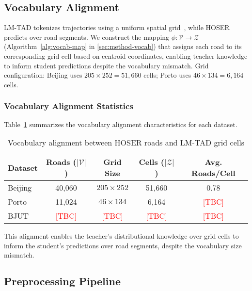 \subsection{Vocabulary Alignment}
\label{sec:data-lmtad-compat}

LM-TAD tokenizes trajectories using a uniform spatial grid~\cite{mbuyaTrajectoryAnomalyDetection2024}, while HOSER predicts over road segments. We construct the mapping $\phi: \mathcal{V} \rightarrow \mathcal{Z}$ (Algorithm~\ref{alg:vocab-map} in \autoref{sec:method-vocab}) that assigns each road to its corresponding grid cell based on centroid coordinates, enabling teacher knowledge to inform student predictions despite the vocabulary mismatch. Grid configuration: Beijing uses $205 \times 252 = 51{,}660$ cells; Porto uses $46 \times 134 = 6{,}164$ cells.

\subsubsection{Vocabulary Alignment Statistics}

Table~\ref{tab:vocab-alignment} summarizes the vocabulary alignment characteristics for each dataset.

\begin{table}[h]
\centering
\caption{Vocabulary alignment between HOSER roads and LM-TAD grid cells}
\label{tab:vocab-alignment}
\small
\begin{tabular}{lcccc}
\toprule
\textbf{Dataset} & \textbf{Roads ($|\mathcal{V}|$)} & \textbf{Grid Size} & \textbf{Cells ($|\mathcal{Z}|$)} & \textbf{Avg. Roads/Cell} \\
\midrule
Beijing & 40,060 & $205 \times 252$ & 51,660 & 0.78 \\
Porto & 11,024 & $46 \times 134$ & 6,164 & \textcolor{red}{[TBC]} \\
BJUT & \textcolor{red}{[TBC]} & \textcolor{red}{[TBC]} & \textcolor{red}{[TBC]} & \textcolor{red}{[TBC]} \\
\bottomrule
\end{tabular}
\end{table}

This alignment enables the teacher's distributional knowledge over grid cells to inform the student's predictions over road segments, despite the vocabulary size mismatch.

\subsection{Preprocessing Pipeline}
\label{sec:data-pipeline}

